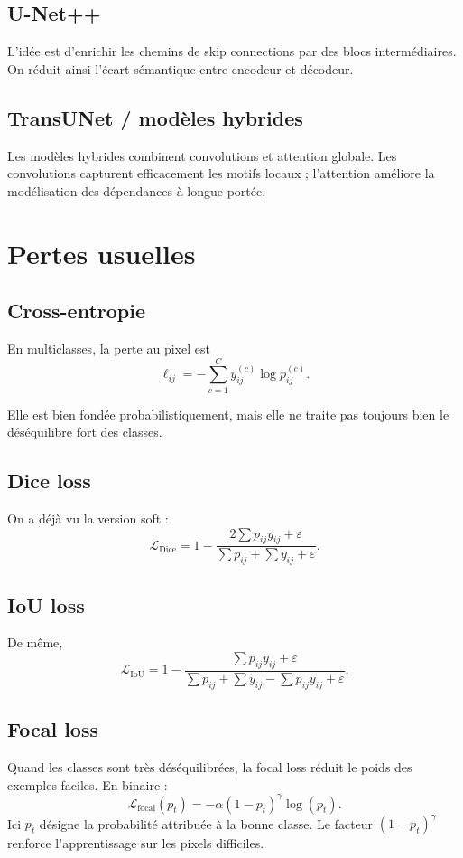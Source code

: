 \documentclass[11pt]{article}
\begin{document}
\subsection{U-Net++}
L'idée est d'enrichir les chemins de skip connections par des blocs intermédiaires. On réduit ainsi l'écart sémantique entre encodeur et décodeur.

\subsection{TransUNet / modèles hybrides}
Les modèles hybrides combinent convolutions et attention globale. Les convolutions capturent efficacement les motifs locaux ; l'attention améliore la modélisation des dépendances à longue portée.

\section{Pertes usuelles}
\subsection{Cross-entropie}
En multiclasses, la perte au pixel est
\[
\ell_{ij} = -\sum_{c=1}^C y_{ij}^{(c)}\log p_{ij}^{(c)}.
\]

Elle est bien fondée probabilistiquement, mais elle ne traite pas toujours bien le déséquilibre fort des classes.

\subsection{Dice loss}
On a déjà vu la version soft :
\[
\mathcal{L}_{\mathrm{Dice}} = 1-\frac{2\sum p_{ij}y_{ij}+\varepsilon}{\sum p_{ij}+\sum y_{ij}+\varepsilon}.
\]

\subsection{IoU loss}
De même,
\[
\mathcal{L}_{\mathrm{IoU}} = 1-\frac{\sum p_{ij}y_{ij}+\varepsilon}{\sum p_{ij}+\sum y_{ij}-\sum p_{ij}y_{ij}+\varepsilon}.
\]

\subsection{Focal loss}
Quand les classes sont très déséquilibrées, la focal loss réduit le poids des exemples faciles. En binaire :
\[
\mathcal{L}_{\mathrm{focal}}(p_t) = -\alpha (1-p_t)^\gamma \log(p_t).
\]
Ici $p_t$ désigne la probabilité attribuée à la bonne classe. Le facteur $(1-p_t)^\gamma$ renforce l'apprentissage sur les pixels difficiles.
\end{document}

